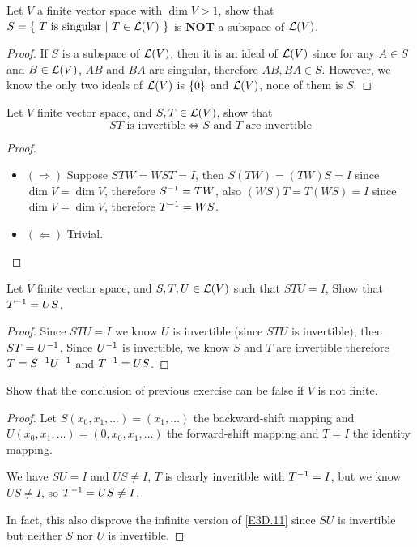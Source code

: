 \documentclass[../main.tex]{subfiles}
\begin{document}
\setcounter{exercise}{3}
\begin{exercise}
  Let $V$ a finite vector space with $\dim V > 1$,
  show that $S = \{ \ T \text{ is singular} \ | \ T \in \mathcal{L}(V) \ \}$ is \textbf{NOT}
  a subspace of $\mathcal{L}(V)$.
\end{exercise}
\begin{proof}
  If $S$ is a subspace of $\mathcal{L}(V)$, then it is an ideal of $\mathcal{L}(V)$ since
  for any $A \in S$ and $B \in \mathcal{L}(V)$, $AB$ and $BA$ are singular,
  therefore $AB, BA \in S$.
  However, we know the only two ideals of $\mathcal{L}(V)$ is $\{0\}$ and $\mathcal{L}(V)$,
  none of them is $S$.
\end{proof}

\setcounter{exercise}{10}
\begin{exercise}
  \label{E3D.11}
  Let $V$ finite vector space, and $S, T \in \mathcal{L}(V)$, show that
  \[
  ST \text{ is invertible} \iff S \text{ and } T \text{ are invertible}
  \]
\end{exercise}
\begin{proof}
  ~
  \begin{itemize}
    \item $(\Rightarrow)$ Suppose $STW = WST = I$,
          then $S(TW) = (TW)S = I$ since $\dim V = \dim V$, therefore $S^{-1} = TW$,
          also $(WS)T = T(WS) = I$ since $\dim V = \dim V$, therefore $T^{-1} = WS$.
    \item $(\Leftarrow)$ Trivial.
  \end{itemize}
\end{proof}

\begin{exercise}
  Let $V$ finite vector space, and $S, T, U \in \mathcal{L}(V)$ such that $STU = I$,
  Show that $T^{-1} = US$.
\end{exercise}
\begin{proof}
  Since $STU = I$ we know $U$ is invertible (since $STU$ is invertible), then $ST = U^{-1}$.
  Since $U^{-1}$ is invertible, we know $S$ and $T$ are invertible therefore $T = S^{-1}U^{-1}$
  and $T^{-1} = US$.
\end{proof}

\begin{exercise}
  Show that the conclusion of previous exercise can be false if $V$ is not finite.
\end{exercise}
\begin{proof}
  Let $S(x_0, x_1, \dots) = (x_1, \dots)$ the backward-shift mapping
  and $U(x_0, x_1, \dots) = (0, x_0, x_1, \dots)$ the forward-shift mapping
  and $T = I$ the identity mapping.

  We have $SU = I$ and $US \neq I$, $T$ is clearly inveritble with $T^{-1} = I$,
  but we know $US \neq I$, so $T^{-1} = US \neq I$.

  In fact, this also disprove the infinite version of \ref{E3D.11} since $SU$ is invertible but neither
  $S$ nor $U$ is invertible.
\end{proof}
\end{document}

